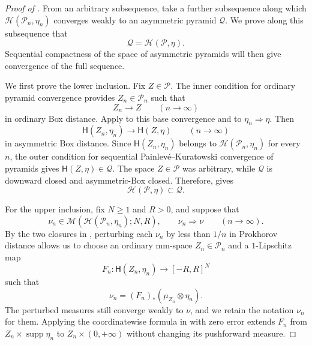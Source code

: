\documentclass[10pt,a4paper]{amsart}
\numberwithin{equation}{section}
\DeclareMathOperator{\supp}{supp}
\begin{document}
\begin{proof}[Proof of ]
From an arbitrary subsequence, take a further subsequence along which
$\mathcal H(\mathcal P_n,\eta_n)$ converges weakly to an asymmetric pyramid $\mathcal Q$.  We prove along this
subsequence that
\[
 \mathcal Q=\mathcal H(\mathcal P,\eta).
\]
Sequential compactness of the space of asymmetric pyramids will then give convergence of the full sequence.

We first prove the lower inclusion.  Fix $Z\in\mathcal P$.  The inner condition for ordinary pyramid convergence
provides $Z_n\in\mathcal P_n$ such that
\[
 Z_n\longrightarrow Z\qquad(n\to\infty)
\]
in ordinary Box distance.  Apply  to this base convergence and to
$\eta_n\Rightarrow\eta$.  Then
\[
 \mathsf H(Z_n,\eta_n)
 \longrightarrow
 \mathsf H(Z,\eta)
 \qquad(n\to\infty)
\]
in asymmetric Box distance.  Since $\mathsf H(Z_n,\eta_n)$ belongs to
$\mathcal H(\mathcal P_n,\eta_n)$ for every $n$, the outer condition for sequential Painlev\'e--Kuratowski
convergence of pyramids gives $\mathsf H(Z,\eta)\in\mathcal Q$.  The space $Z\in\mathcal P$ was arbitrary, while
$\mathcal Q$ is downward closed and asymmetric-Box closed.  Therefore,  gives
\begin{equation}\label{eq:joint-horocone-lower-inclusion}
 \mathcal H(\mathcal P,\eta)\subset\mathcal Q.
\end{equation}

For the upper inclusion, fix $N\ge1$ and $R>0$, and suppose that
\[
 \nu_n\in
 \mathcal M(\mathcal H(\mathcal P_n,\eta_n);N,R),
 \qquad
 \nu_n\Rightarrow\nu
 \qquad(n\to\infty).
\]
By the two closures in , perturbing each $\nu_n$
by less than $1/n$ in Prokhorov distance allows us to choose an ordinary mm-space $Z_n\in\mathcal P_n$ and a
$1$-Lipschitz map
\[
 F_n\colon\mathsf H(Z_n,\eta_n)\longrightarrow[-R,R]^N
\]
such that
\begin{equation}\label{eq:joint-measurement-realization}
 \nu_n=(F_n)_*(\mu_{Z_n}\otimes\eta_n).
\end{equation}
The perturbed measures still converge weakly to $\nu$, and we retain the notation $\nu_n$ for them.  Applying the
coordinatewise formula in  with zero error extends $F_n$ from
$Z_n\times\supp\eta_n$ to $Z_n\times(0,+\infty)$ without changing its pushforward measure.


\end{proof}
\end{document}
